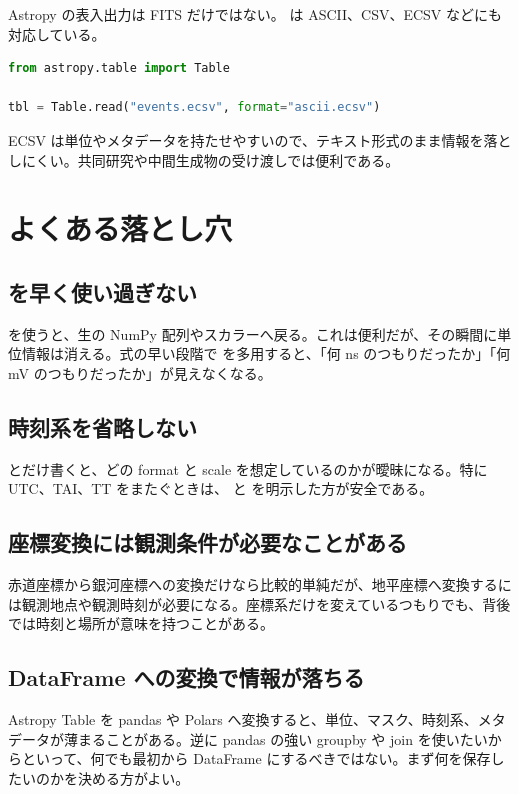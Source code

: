 Astropy の表入出力は FITS だけではない。 は ASCII、CSV、ECSV などにも対応している。

\begin{lstlisting}[language=Python]
from astropy.table import Table

tbl = Table.read("events.ecsv", format="ascii.ecsv")
\end{lstlisting}

ECSV は単位やメタデータを持たせやすいので、テキスト形式のまま情報を落としにくい。共同研究や中間生成物の受け渡しでは便利である。

\section{よくある落とし穴}

\subsection{ を早く使い過ぎない}

 を使うと、生の NumPy 配列やスカラーへ戻る。これは便利だが、その瞬間に単位情報は消える。式の早い段階で  を多用すると、「何 ns のつもりだったか」「何 mV のつもりだったか」が見えなくなる。

\subsection{時刻系を省略しない}

 とだけ書くと、どの format と scale を想定しているのかが曖昧になる。特に UTC、TAI、TT をまたぐときは、 と  を明示した方が安全である。

\subsection{座標変換には観測条件が必要なことがある}

赤道座標から銀河座標への変換だけなら比較的単純だが、地平座標へ変換するには観測地点や観測時刻が必要になる。座標系だけを変えているつもりでも、背後では時刻と場所が意味を持つことがある。

\subsection{DataFrame への変換で情報が落ちる}

Astropy Table を pandas や Polars へ変換すると、単位、マスク、時刻系、メタデータが薄まることがある。逆に pandas の強い groupby や join を使いたいからといって、何でも最初から DataFrame にするべきではない。まず何を保存したいのかを決める方がよい。

